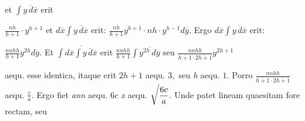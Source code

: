 %
et
$\displaystyle\!\!\int\!\!\overline{y\,d\overline{x}}$
erit\rule[0mm]{0pt}{5,0mm}
$\displaystyle\frac{nh}{h+1}\cdot y^{h+1}$
et
$\displaystyle d\overline{x}\!\!\int\!\!\overline{y\,d\overline{x}}$
erit:%
$\displaystyle\frac{nh}{h+1}y^{h+1}\cdot nh\cdot y^{h-1}d\overline{y}.$
Ergo $\displaystyle d\overline{x}\!\!\int\!\!\overline{y\,d\overline{x}}$
erit:\rule[0mm]{0pt}{5,0mm}
$\displaystyle\frac{nnhh}{h+1}y^{2h}d\overline{y}.$
Et
$\displaystyle\!\!\int\!\!\overline{d\overline{x}\!\!\int\!\!\overline{y\,d\overline{x}}}$
erit
%
$\displaystyle\frac{nnhh}{h+1}\!\!\int\!\!\overline{y^{2h}\,d\overline{y}}$
seu %
$\displaystyle\frac{nnhh}{\overline{h+1} \cdot \overline{2h+1}}y^{2h+1}$%
\protect\rule[0mm]{0pt}{6mm}aequ.
%
esse identica,
itaque 
\pend
\newpage%
\pstart
\noindent
erit
$2h+1$ aequ. $3,$ seu \textit{h} aequ. $1.$
Porro
$\displaystyle\frac{nnhh}{\overline{h+1} \cdot \overline{2h+1}}$
aequ. %
$\displaystyle\frac{c}{a}.$
Ergo fiet \textit{ann} aequ. $6c$
%
\textit{x} aequ. $\displaystyle\sqrt{\protect\vphantom{\protect\mathstrut{\frac{6c}{a}}}}\frac{6c}{a}.$
Unde patet %
lineam quaesitam\protect{} fore rectam,
seu\rule[0mm]{0pt}{5,0mm}
